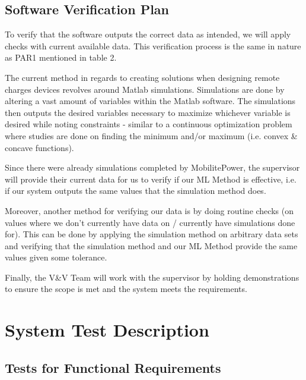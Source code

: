 \documentclass[12pt, titlepage]{article}
\begin{document}
\subsection{Software Verification Plan}
To verify that the software outputs the correct data as intended, we will apply checks with current available data. This verification process is the same in nature as PAR1 mentioned in table 2. 
\par
The current method in regards to creating solutions when designing remote charges devices revolves around Matlab simulations. Simulations are done by altering a vast amount of variables within the Matlab software. The simulations then outputs the desired variables necessary to maximize whichever variable is desired while noting constraints - similar to a continuous optimization problem where studies are done on finding the minimum and/or maximum (i.e. convex \& concave functions). 
\par
Since there were already simulations completed by MobilitePower, the supervisor will provide their current data for us to verify if our ML Method is effective, i.e. if our system outputs the same values that the simulation method does. 
\par
Moreover, another method for verifying our data is by doing routine checks (on values where we don’t currently have data on / currently have simulations done for). This can be done by applying the simulation method on arbitrary data sets and verifying that the simulation method and our ML Method provide the same values given some tolerance. 
\par
Finally, the V\&V Team will work with the supervisor by holding demonstrations to ensure the scope is met and the system meets the requirements.

\section{System Test Description}
\subsection{Tests for Functional Requirements}
\end{document}
